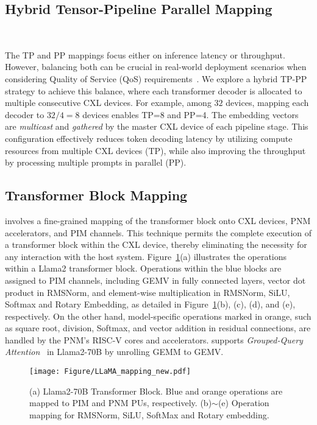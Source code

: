 \subsection{Hybrid Tensor-Pipeline Parallel Mapping}~\label{subsec:hybrid_parallel}

The TP and PP mappings focus either on inference latency or throughput.
However, balancing both can be crucial in real-world deployment scenarios when considering Quality of Service (QoS) requirements~\cite{mlperf-sla}.
We explore a hybrid TP-PP strategy to achieve this balance, where each transformer decoder is allocated to multiple consecutive CXL devices. For example, among $32$ devices, mapping each decoder to $32/4=8$ devices enables TP=8 and PP=4.
The embedding vectors are \textit{multicast} and \textit{gathered} by the master CXL device of each pipeline stage.
This configuration effectively reduces token decoding latency by utilizing compute resources from multiple CXL devices (TP), while also improving the throughput by processing multiple prompts in parallel (PP).

\subsection{Transformer Block Mapping} \label{subsec:block_mapping}

\att{} involves a fine-grained mapping of the transformer block onto CXL devices, PNM accelerators, and PIM channels.
This technique permits the complete execution of a transformer block within the CXL device, thereby eliminating the necessity for any interaction with the host system.
Figure~\ref{fig:LLaMA_mapping}(a) illustrates the operations within a Llama2 transformer block. 
Operations within the blue blocks are assigned to PIM channels, including GEMV in fully connected layers, vector dot product in RMSNorm, and element-wise multiplication in RMSNorm, SiLU, Softmax and Rotary Embedding, as detailed in Figure~\ref{fig:LLaMA_mapping}(b), (c), (d), and (e), respectively.
On the other hand, model-specific operations marked in orange, such as square root, division, Softmax, and vector addition in residual connections, are handled by the PNM's RISC-V cores and accelerators.
\att{} supports \textit{Grouped-Query Attention}~\cite{gqa} in Llama2-70B by unrolling GEMM to GEMV.

\begin{figure}[h]
	\centering
    \texttt{[image: Figure/LLaMA\_mapping\_new.pdf]}
    \caption{(a) Llama2-70B Transformer Block. Blue and orange operations are mapped to PIM and PNM PUs, respectively.
    (b)$\sim$(e) Operation mapping for RMSNorm, SiLU, SoftMax and Rotary embedding.}
	\label{fig:LLaMA_mapping}
\end{figure}

